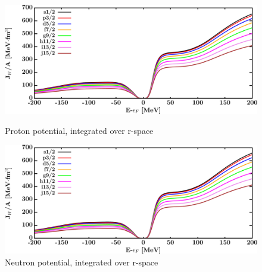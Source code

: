 \begin{figure}[H]
    \centering
    \begin{minipage}{0.45\textwidth}
        \centering
        \includegraphics[width=1.0\textwidth]{figures/ca40_protonVolumeIntegrals.png}
        \caption{Proton potential, integrated over r-space}
        \label{DOMFitData_ca40_proton_potentialIntegral}
    \end{minipage}\hfill
    \begin{minipage}{0.45\textwidth}
        \centering
        \includegraphics[width=1.0\textwidth]{figures/ca40_neutronVolumeIntegrals.png}
        \caption{Neutron potential, integrated over r-space}
        \label{DOMFitData_ca40_neutron_potentialIntegral}
    \end{minipage}
\end{figure}

\afterpage{\clearpage}

